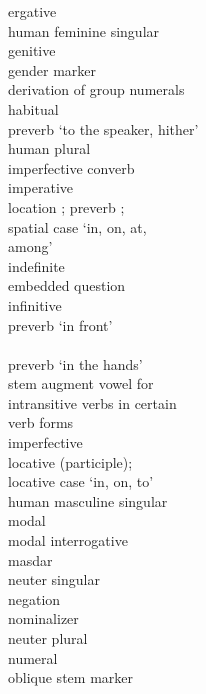 \begin{multicols}{2}
\begin{tabbing}
				\>	{ergative}\\
				\>	human feminine singular\\
				\>	{genitive}\\
				\> {gender} marker\\
				\> {derivation} of group numerals\\
				\>	habitual\\
				\>	{preverb} `to the speaker, hither'\\
				\>	human plural\\
				\>	{imperfective converb}\\
				\>	{imperative}\\
				\>	location \sqt{in}; {preverb} ;\\
			{}		\>	    {spatial case} `in, on, at, \\ \> among' \\
				\>	indefinite\\
				\>	embedded question\\
				\>	{infinitive}\\
				\>	{preverb} `in front'\\
				\>	\\
						\> {preverb} `in the hands'\\
				\>	stem augment vowel for \\ \> intransitive verbs in certain \\ \> verb forms\\
				\>	imperfective\\
				\>	locative ({participle});\\
			{}		\>	locative case `in, on, to'\\
					\>	human masculine singular\\
				\>	modal\\
				\>	{modal interrogative}\\
				\>	{masdar}\\
					\>	neuter singular\\
				\>	{negation}\\
				\>	{nominalizer}\\
				\>	neuter plural\\
				\>	numeral\\
				\>	{oblique stem} marker\\

\end{tabbing}
\end{multicols}
